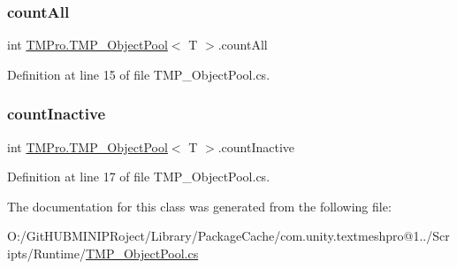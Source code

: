 \subsubsection{\texorpdfstring{countAll}{countAll}}
{\footnotesize\ttfamily int \mbox{\hyperlink{class_t_m_pro_1_1_t_m_p___object_pool}{T\+M\+Pro.\+T\+M\+P\+\_\+\+Object\+Pool}}$<$ T $>$.count\+All\hspace{0.3cm}{\ttfamily [get]}}



Definition at line 15 of file T\+M\+P\+\_\+\+Object\+Pool.\+cs.

\mbox{\label{class_t_m_pro_1_1_t_m_p___object_pool_a2e5c8c7744a87bfd9723d1b92f65f929}} 
\subsubsection{\texorpdfstring{countInactive}{countInactive}}
{\footnotesize\ttfamily int \mbox{\hyperlink{class_t_m_pro_1_1_t_m_p___object_pool}{T\+M\+Pro.\+T\+M\+P\+\_\+\+Object\+Pool}}$<$ T $>$.count\+Inactive\hspace{0.3cm}{\ttfamily [get]}}



Definition at line 17 of file T\+M\+P\+\_\+\+Object\+Pool.\+cs.



The documentation for this class was generated from the following file\+:\begin{DoxyCompactItemize}
\item 
O\+:/\+Git\+H\+U\+B\+M\+I\+N\+I\+P\+Roject/\+Library/\+Package\+Cache/com.\+unity.\+textmeshpro@1../\+Scripts/\+Runtime/\mbox{\hyperlink{_t_m_p___object_pool_8cs}{T\+M\+P\+\_\+\+Object\+Pool.\+cs}}\end{DoxyCompactItemize}
